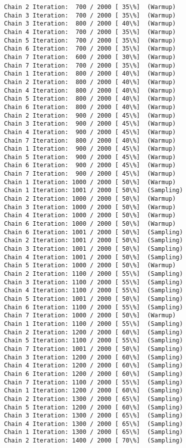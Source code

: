 \documentclass[11pt]{article}
\begin{document}
\begin{Verbatim}[commandchars=\\\{\}]
Chain 2 Iteration:  700 / 2000 [ 35\%]  (Warmup)
Chain 3 Iteration:  700 / 2000 [ 35\%]  (Warmup)
Chain 3 Iteration:  800 / 2000 [ 40\%]  (Warmup)
Chain 4 Iteration:  700 / 2000 [ 35\%]  (Warmup)
Chain 5 Iteration:  700 / 2000 [ 35\%]  (Warmup)
Chain 6 Iteration:  700 / 2000 [ 35\%]  (Warmup)
Chain 7 Iteration:  600 / 2000 [ 30\%]  (Warmup)
Chain 7 Iteration:  700 / 2000 [ 35\%]  (Warmup)
Chain 1 Iteration:  800 / 2000 [ 40\%]  (Warmup)
Chain 2 Iteration:  800 / 2000 [ 40\%]  (Warmup)
Chain 4 Iteration:  800 / 2000 [ 40\%]  (Warmup)
Chain 5 Iteration:  800 / 2000 [ 40\%]  (Warmup)
Chain 6 Iteration:  800 / 2000 [ 40\%]  (Warmup)
Chain 2 Iteration:  900 / 2000 [ 45\%]  (Warmup)
Chain 3 Iteration:  900 / 2000 [ 45\%]  (Warmup)
Chain 4 Iteration:  900 / 2000 [ 45\%]  (Warmup)
Chain 7 Iteration:  800 / 2000 [ 40\%]  (Warmup)
Chain 1 Iteration:  900 / 2000 [ 45\%]  (Warmup)
Chain 5 Iteration:  900 / 2000 [ 45\%]  (Warmup)
Chain 6 Iteration:  900 / 2000 [ 45\%]  (Warmup)
Chain 7 Iteration:  900 / 2000 [ 45\%]  (Warmup)
Chain 1 Iteration: 1000 / 2000 [ 50\%]  (Warmup)
Chain 1 Iteration: 1001 / 2000 [ 50\%]  (Sampling)
Chain 2 Iteration: 1000 / 2000 [ 50\%]  (Warmup)
Chain 3 Iteration: 1000 / 2000 [ 50\%]  (Warmup)
Chain 4 Iteration: 1000 / 2000 [ 50\%]  (Warmup)
Chain 6 Iteration: 1000 / 2000 [ 50\%]  (Warmup)
Chain 6 Iteration: 1001 / 2000 [ 50\%]  (Sampling)
Chain 2 Iteration: 1001 / 2000 [ 50\%]  (Sampling)
Chain 3 Iteration: 1001 / 2000 [ 50\%]  (Sampling)
Chain 4 Iteration: 1001 / 2000 [ 50\%]  (Sampling)
Chain 5 Iteration: 1000 / 2000 [ 50\%]  (Warmup)
Chain 2 Iteration: 1100 / 2000 [ 55\%]  (Sampling)
Chain 3 Iteration: 1100 / 2000 [ 55\%]  (Sampling)
Chain 4 Iteration: 1100 / 2000 [ 55\%]  (Sampling)
Chain 5 Iteration: 1001 / 2000 [ 50\%]  (Sampling)
Chain 6 Iteration: 1100 / 2000 [ 55\%]  (Sampling)
Chain 7 Iteration: 1000 / 2000 [ 50\%]  (Warmup)
Chain 1 Iteration: 1100 / 2000 [ 55\%]  (Sampling)
Chain 2 Iteration: 1200 / 2000 [ 60\%]  (Sampling)
Chain 5 Iteration: 1100 / 2000 [ 55\%]  (Sampling)
Chain 7 Iteration: 1001 / 2000 [ 50\%]  (Sampling)
Chain 3 Iteration: 1200 / 2000 [ 60\%]  (Sampling)
Chain 4 Iteration: 1200 / 2000 [ 60\%]  (Sampling)
Chain 6 Iteration: 1200 / 2000 [ 60\%]  (Sampling)
Chain 7 Iteration: 1100 / 2000 [ 55\%]  (Sampling)
Chain 1 Iteration: 1200 / 2000 [ 60\%]  (Sampling)
Chain 2 Iteration: 1300 / 2000 [ 65\%]  (Sampling)
Chain 5 Iteration: 1200 / 2000 [ 60\%]  (Sampling)
Chain 3 Iteration: 1300 / 2000 [ 65\%]  (Sampling)
Chain 4 Iteration: 1300 / 2000 [ 65\%]  (Sampling)
Chain 1 Iteration: 1300 / 2000 [ 65\%]  (Sampling)
Chain 2 Iteration: 1400 / 2000 [ 70\%]  (Sampling)

\end{Verbatim}
\end{document}
